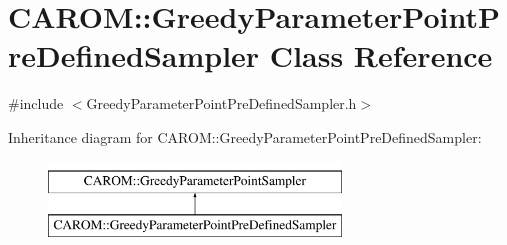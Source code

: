 \hypertarget{class_c_a_r_o_m_1_1_greedy_parameter_point_pre_defined_sampler}{\section{C\-A\-R\-O\-M\-:\-:Greedy\-Parameter\-Point\-Pre\-Defined\-Sampler Class Reference}
\label{class_c_a_r_o_m_1_1_greedy_parameter_point_pre_defined_sampler}
}


{\ttfamily \#include $<$Greedy\-Parameter\-Point\-Pre\-Defined\-Sampler.\-h$>$}

Inheritance diagram for C\-A\-R\-O\-M\-:\-:Greedy\-Parameter\-Point\-Pre\-Defined\-Sampler\-:\begin{figure}[H]
\begin{center}
\leavevmode
\includegraphics[height=2.000000cm]{class_c_a_r_o_m_1_1_greedy_parameter_point_pre_defined_sampler}
\end{center}
\end{figure}
